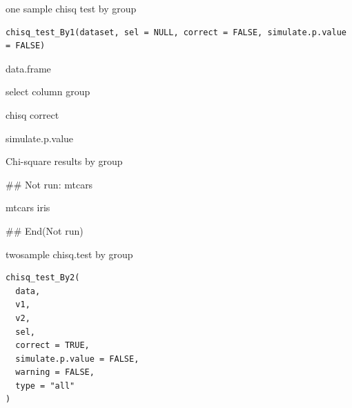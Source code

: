 \documentclass[a4paper]{book}
\begin{document}
%
\begin{Description}
one sample chisq test by group
\end{Description}
%
\begin{Usage}
\begin{verbatim}
chisq_test_By1(dataset, sel = NULL, correct = FALSE, simulate.p.value = FALSE)
\end{verbatim}
\end{Usage}
%
\begin{Arguments}
\begin{ldescription}
\item[\code{dataset}] data.frame

\item[\code{sel}] select column group

\item[\code{correct}] chisq correct

\item[\code{simulate.p.value}] simulate.p.value
\end{ldescription}
\end{Arguments}
%
\begin{Value}
Chi-square results by group
\end{Value}
%
\begin{Examples}
\begin{ExampleCode}
\#\# Not run: 
mtcars%

mtcars%
iris%

## End(Not run)
\end{ExampleCode}
\end{Examples}
%
\begin{Description}
twosample chisq.test by group
\end{Description}
%
\begin{Usage}
\begin{verbatim}
chisq_test_By2(
  data,
  v1,
  v2,
  sel,
  correct = TRUE,
  simulate.p.value = FALSE,
  warning = FALSE,
  type = "all"
)
\end{verbatim}
\end{Usage}
%
\end{document}

